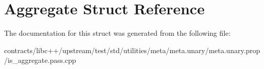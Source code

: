 \hypertarget{struct_aggregate}{}\section{Aggregate Struct Reference}
\label{struct_aggregate}


The documentation for this struct was generated from the following file\+:\begin{DoxyCompactItemize}
\item 
contracts/libc++/upstream/test/std/utilities/meta/meta.\+unary/meta.\+unary.\+prop/is\+\_\+aggregate.\+pass.\+cpp\end{DoxyCompactItemize}
